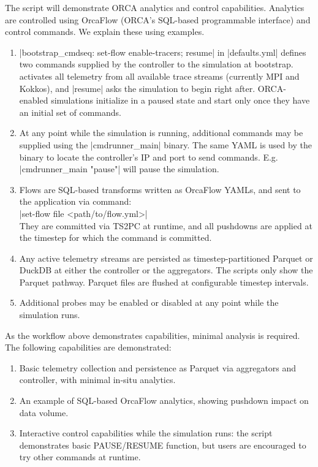 \documentclass[nonacm,sigconf]{acmart}
\begin{document}
The script will demonstrate ORCA analytics and control capabilities. Analytics
are controlled using OrcaFlow (ORCA's SQL-based programmable interface) and
control commands. We explain these using examples.

\begin{enumerate}
	\item \code|bootstrap_cmdseq: set-flow enable-tracers; resume| in
	      \code|defaults.yml| defines two commands supplied by the controller to
	      the simulation at bootstrap.  activates
	      all telemetry from all available trace streams (currently MPI and
	      Kokkos), and \code|resume| asks the simulation to begin right after.
	      ORCA-enabled simulations initialize in a paused state and start only
	      once they have an initial set of commands.
	\item At any point while the simulation is running, additional commands may
	      be supplied using the \code|cmdrunner_main| binary. The same YAML is
	      used by the binary to locate the controller's IP and port to send
	      commands. E.g. \code|cmdrunner_main "pause"| will pause the simulation.
	\item Flows are SQL-based transforms written as OrcaFlow YAMLs, and sent to
	      the application via command: \\
        \null\hfill\code|set-flow file <path/to/flow.yml>|\hfill\null \\
	      They are committed via TS2PC at runtime, and all pushdowns are applied
	      at the timestep for which the command is committed.
	\item Any active telemetry streams are persisted as timestep-partitioned
	      Parquet or DuckDB at either the controller or the aggregators. The
	      scripts only show the Parquet pathway. Parquet files are flushed at
	      configurable timestep intervals.
	\item Additional probes may be enabled or disabled at any point while the
	      simulation runs.
\end{enumerate}

\artout

As the workflow above demonstrates capabilities, minimal analysis is required.
The following capabilities are demonstrated:
\begin{enumerate}
	\item Basic telemetry collection and persistence as Parquet via aggregators
	      and controller, with minimal in-situ analytics.
	\item An example of SQL-based OrcaFlow analytics, showing pushdown impact on
	      data volume.
	\item Interactive control capabilities while the simulation runs: the script
    demonstrates basic \textsf{PAUSE/RESUME} function, but users are encouraged to
	      try other commands at runtime.
\end{enumerate}
\end{document}
